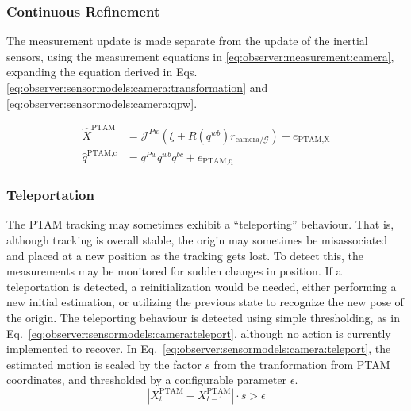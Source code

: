     \subsubsection{Continuous Refinement}
        \label{sssec:observer:sensormodels:camera:refinement}
        The measurement update is made separate from the update of the inertial sensors, using
        the measurement equations in \eqref{eq:observer:measurement:camera}, expanding the
        equation derived in Eqs. \eqref{eq:observer:sensormodels:camera:transformation} and \eqref{eq:observer:sensormodels:camera:qpw}.

        \begin{subequations}
            \label{eq:observer:measurement:camera}
            \begin{align}
                \hat{X}^{\text{PTAM}} &= \mathcal{J}^{Pw} (\xi + R(q^{wb})r_{\text{camera}/\mathcal{G}}) + e_{\text{PTAM,X}} \\
                \hat{q}^{\text{PTAM,c}} &= q^{Pw} q^{wb} q^{bc} + e_{\text{PTAM,q}}
            \end{align}
        \end{subequations}

    \subsubsection{Teleportation}
        \label{sssec:observer:sensormodels:camera:teleportation}
        The PTAM tracking may sometimes exhibit a ``teleporting'' behaviour.
        That is, although tracking is overall stable, the origin may
        sometimes be misassociated and placed at a new position as the
        tracking gets lost.
        To detect this, the measurements may be monitored for sudden changes in position.
        If a teleportation is detected, a reinitialization would be needed,
        either performing a new initial estimation, or utilizing the previous state
        to recognize the new pose of the origin.
        The teleporting behaviour is detected using simple thresholding,
        as in Eq.~\eqref{eq:observer:sensormodels:camera:teleport},
        although no action is currently implemented to recover.
        In Eq.~\eqref{eq:observer:sensormodels:camera:teleport}, the
        estimated motion is scaled by the factor $s$ from the tranformation
        from PTAM coordinates, and thresholded by a configurable parameter $\epsilon$.
        \begin{equation}
            \label{eq:observer:sensormodels:camera:teleport}
            \left|X^{\text{PTAM}}_{t} - X^{\text{PTAM}}_{t-1}\right| \cdot s > \epsilon
        \end{equation}
